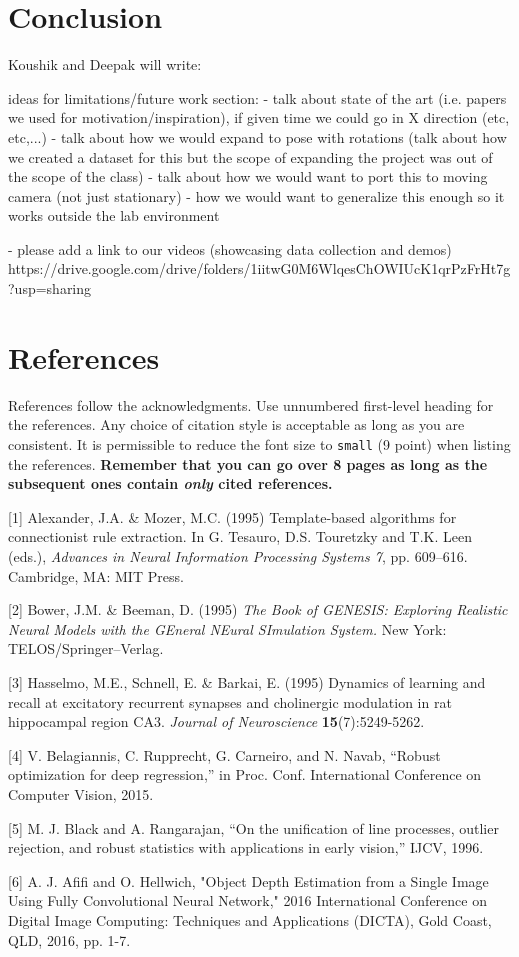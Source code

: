 \documentclass{article}
\begin{document}
\section{Conclusion}

Koushik and Deepak will write:

ideas for limitations/future work section:
- talk about state of the art (i.e. papers we used for motivation/inspiration), if given time we could go in X direction (etc, etc,...) 
- talk about how we would expand to pose with rotations (talk about how we created a dataset for this but the scope of expanding the project was out of the scope of the class)
- talk about how we would want to port this to moving camera (not just stationary)
- how we would want to generalize this enough so it works outside the lab environment

- please add a link to our videos (showcasing data collection and demos)
https://drive.google.com/drive/folders/1iitwG0M6WlqesChOWIUcK1qrPzFrHt7g?usp=sharing

\section*{References}

References follow the acknowledgments. Use unnumbered first-level
heading for the references. Any choice of citation style is acceptable
as long as you are consistent. It is permissible to reduce the font
size to \verb+small+ (9 point) when listing the references. {\bf
  Remember that you can go over 8 pages as long as the subsequent ones contain
  \emph{only} cited references.}
\medskip

\small

[1] Alexander, J.A. \& Mozer, M.C. (1995) Template-based algorithms
for connectionist rule extraction. In G. Tesauro, D.S. Touretzky and
T.K. Leen (eds.), {\it Advances in Neural Information Processing
  Systems 7}, pp. 609--616. Cambridge, MA: MIT Press.

[2] Bower, J.M. \& Beeman, D. (1995) {\it The Book of GENESIS:
  Exploring Realistic Neural Models with the GEneral NEural SImulation
  System.}  New York: TELOS/Springer--Verlag.

[3] Hasselmo, M.E., Schnell, E. \& Barkai, E. (1995) Dynamics of
learning and recall at excitatory recurrent synapses and cholinergic
modulation in rat hippocampal region CA3. {\it Journal of
  Neuroscience} {\bf 15}(7):5249-5262.

[4] V. Belagiannis, C. Rupprecht, G. Carneiro, and N. Navab, “Robust
optimization for deep regression,” in Proc. Conf. International
Conference on Computer Vision, 2015.

[5] M. J. Black and A. Rangarajan, “On the unification of line processes,
outlier rejection, and robust statistics with applications in early vision,”
IJCV, 1996.

[6] A. J. Afifi and O. Hellwich, "Object Depth Estimation from a Single Image Using Fully Convolutional Neural Network," 2016 International Conference on Digital Image Computing: Techniques and Applications (DICTA), Gold Coast, QLD, 2016, pp. 1-7.
\end{document}

